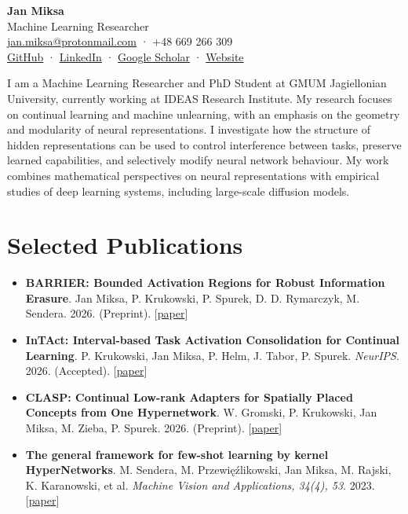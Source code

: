 \documentclass[11pt,a4paper]{article}
\begin{document}
\begin{center}
  {\Huge\bfseries Jan Miksa}\\[3pt]
  {\large Machine Learning Researcher}
  \\[3pt] {\small \href{mailto:jan.miksa@protonmail.com}{jan.miksa@protonmail.com} · +48 669 266 309}
  \\[2pt] {\small\href{https://github.com/OneAndZero24}{GitHub}} · {\small\href{https://www.linkedin.com/in/jan-miksa24/}{LinkedIn}} · {\small\href{https://scholar.google.com/citations?user=bTL7lzgAAAAJ}{Google Scholar}} · {\small\href{https://oneandzero24.github.io/}{Website}}
\end{center}
\vspace{-4pt}
\par\vspace{4pt}\noindent I am a Machine Learning Researcher and PhD Student at GMUM Jagiellonian University, currently working at IDEAS Research Institute. My research focuses on continual learning and machine unlearning, with an emphasis on the geometry and modularity of neural representations. I investigate how the structure of hidden representations can be used to control interference between tasks, preserve learned capabilities, and selectively modify neural network behaviour. My work combines mathematical perspectives on neural representations with empirical studies of deep learning systems, including large-scale diffusion models.
\section*{Selected Publications}
\begin{itemize}[leftmargin=1.2em,topsep=0.5pt,itemsep=1.5pt,parsep=0pt]
\item \textbf{BARRIER: Bounded Activation Regions for Robust Information Erasure}. Jan Miksa, P. Krukowski, P. Spurek, D. D. Rymarczyk, M. Sendera. 2026. ({\color{graytext}Preprint}). [\href{https://arxiv.org/abs/2605.15737}{paper}]
\item \textbf{InTAct: Interval-based Task Activation Consolidation for Continual Learning}. P. Krukowski, Jan Miksa, P. Helm, J. Tabor, P. Spurek. \textit{NeurIPS}. 2026. ({\color{graytext}Accepted}). [\href{https://arxiv.org/abs/2511.17439}{paper}]
\item \textbf{CLASP: Continual Low-rank Adapters for Spatially Placed Concepts from One Hypernetwork}. W. Gromski, P. Krukowski, Jan Miksa, M. Zieba, P. Spurek. 2026. ({\color{graytext}Preprint}). [\href{https://arxiv.org/abs/2610.01331}{paper}]
\item \textbf{The general framework for few-shot learning by kernel HyperNetworks}. M. Sendera, M. Przewięźlikowski, Jan Miksa, M. Rajski, K. Karanowski, et al. \textit{Machine Vision and Applications, 34(4), 53}. 2023. [\href{https://doi.org/10.1007/s00138-023-01403-4}{paper}]
\end{itemize}
\end{document}
